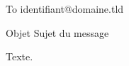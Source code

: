 \documentclass[%
]{AfficheCourriel}
\begin{document}
\begin{mylist}
	\item[To] identifiant@domaine.tld
	\item[Objet] Sujet du message
\end{mylist}

Texte.

\signature{Auteur}

\end{document}
